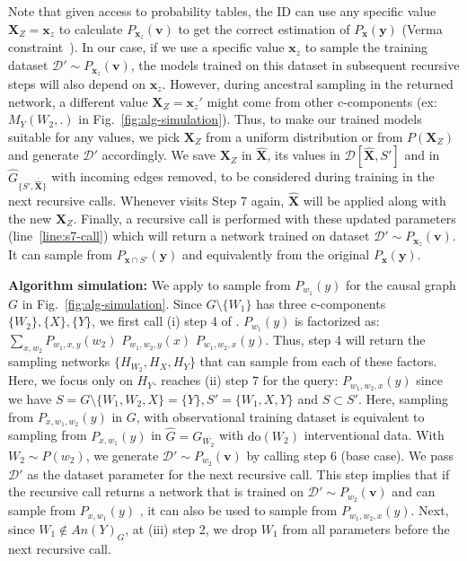 \documentclass{article}
\newcommand{\x}{\mathbf{x}}
\newcommand{\y}{\mathbf{y}}
\newcommand{\X}{\mathbf{X}}
\newcommand{\Xp}{{\hat{\mathbf{X}}}}
\newcommand{\Gp}{{\hat{{G}}}}
\newcommand{\Y}{\mathbf{Y}}
\newcommand{\vb}{\mathbf{v}}
\newcommand{\Do}{\text{do}}
\newcommand{\data}{\mathcal{D}}
\newcommand{\idgen}{\text{ID-GEN}\xspace}
\theoremstyle{plain}
\theoremstyle{definition}
\theoremstyle{remark}
\begin{document}
Note that given access to probability tables, the ID can use any specific value $\X_Z= \x_z$ to calculate $P_{\x_z}(\vb)$ to get the correct estimation of $P_{\x}(\y)$ (Verma  constraint~\citep{Verma1990EquivalenceAS, shpitser2008complete}).
In our case, if we use a specific value $\x_z$ to sample the training dataset $\data' \sim P_{\x_z}(\vb)$,
 the models trained on this dataset in subsequent recursive steps will also depend on $\x_z$.
However, during ancestral sampling in the returned network, a different value $\X_Z= \x_z'$ might come from other c-components (ex: $M_{Y}(W_2, .)$ in Fig.~\ref{fig:alg-simulation}). Thus, to make our trained models suitable for any values, we pick $\X_Z$ from a uniform distribution or from $P(\X_Z)$ and generate $\data'$ accordingly. We save $\X_Z$  in $\Xp$, its values in $\data[\Xp, S']$ and in $\Gp_{\{S', \overline{\Xp}\}}$ with incoming edges removed, to be considered during training in the next recursive calls.  Whenever \idgen visits Step 7 again, $\Xp$ will be applied along with the new $\X_Z$. 
Finally, a recursive call is performed with these updated parameters (line~\ref{line:s7-call}) which will return a network
trained on dataset $\data' \sim P_{\x_z}(\vb)$. It can sample from $P_{\x\cap S'}(\y)$ and equivalently from the original $P_{\x}(\y)$.
%
%
%
\par
\textbf{Algorithm simulation:}
We apply \idgen to sample from  $P_{w_1}(y)$ for the causal graph $G$ in Fig.~\ref{fig:alg-simulation}.
Since $G\setminus \{W_1\}$ has three c-components $\{W_2\}, \{X\},\{Y\}$, we first call (i) step 4 of \idgen.
$P_{w_1}(y)$ is factorized as: $\sum_{x,w_2}P_{w_1, x,y }(w_2)$ $P_{w_1, w_2, y}(x) $ $P_{w_1,  w_2, x}(y)$. Thus, step 4 will return the sampling networks $\{H_{W_2}, H_{X}, H_{Y}\}$ that can sample from each of these factors.
%
Here, we focus only on $H_{Y}$. 
\idgen reaches (ii) step 7 for the query: $P_{w_1,  w_2, x}(y)$ since we have $S= G\setminus\{W_1, W_2, X\}=\{Y\}, S'=\{W_1, X,Y\}$ and $S\subset S'$.
%
Here, sampling from $P_{x,w_1,w_2}(y)$ in $G$, with observational training dataset is equivalent to sampling from $P_{x,w_1}(y)$ in $\Gp = G_{\overline{W_2}}$ with $\Do(W_2)$ interventional data.
%
With $W_2\sim P(w_2)$, we generate $\data' \sim P_{w_2}(\vb)$  by calling step 6 (base case).
We pass $\data'$ as the dataset parameter for the next recursive call. 
%
This step implies that if the recursive call returns a network that is trained on $\data' \sim P_{w_2}(\vb)$ and can sample from $P_{x,w_1}(y)$ , it can also be used to sample from $P_{w_1, w_2, x}(y)$. Next, since $W_1 \notin An(Y)_G$, at (iii) step 2, we drop $W_1$ from all parameters before the next recursive call.
\end{document}
